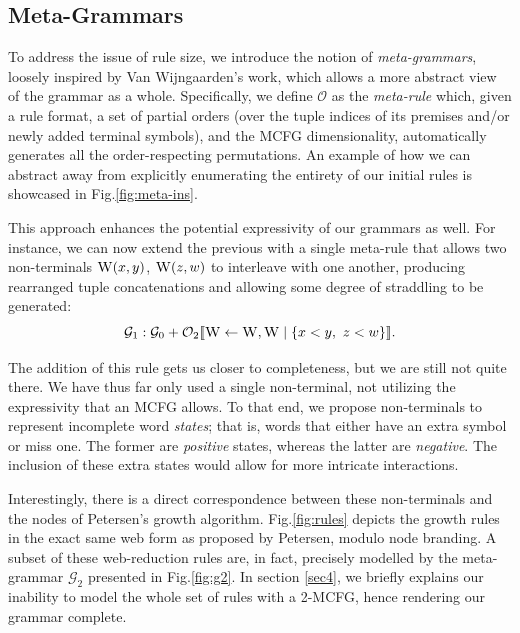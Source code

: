 \documentclass[nonatbib,numbers,10pt]{llncs}
\newcommand\s{\textsc}
\newcommand{\Orderr}[5]{
	\mathcal{#1}_{#5}\llbracket #2 \leftarrow #3 \mid \{ #4 \} \rrbracket.
}
\newcommand{\Or}[4]{\Orderr{O}{#1}{#2}{#3}{#4}}
\begin{document}
\subsection{Meta-Grammars}\label{subsec22}
To address the issue of rule size, we introduce the notion of \textit{meta-grammars}, loosely inspired by Van Wijngaarden's work\cite{vanwijn}, which allows a more abstract view of the grammar as a whole. Specifically, we define $\mathcal{O}$ as the \textit{meta-rule} which, given a rule format, a set of partial orders (over the tuple indices of its premises and/or newly added terminal symbols), and the MCFG dimensionality, automatically generates all the order-respecting permutations. An example of how we can abstract away from explicitly enumerating the entirety of our initial rules is showcased in Fig.\ref{fig:meta-ins}.

This approach enhances the potential expressivity of our grammars as well. For instance, we can now extend the previous with a single meta-rule that allows two non-terminals $\s{W}(x,y)$, $\s{W}(z,w)$ to interleave with one another, producing rearranged tuple concatenations and allowing some degree of straddling to be generated:
\[
\mathcal{G}_1: \mathcal{G}_0 + \Or{\s{W}}{\s{W}, \s{W}}{x < y,\ z < w}{2}
\]

The addition of this rule gets us closer to completeness, but we are still not quite there. We have thus far only used a single non-terminal, not utilizing the expressivity that an MCFG allows. To that end, we propose non-terminals to represent incomplete word \textit{states}; that is, words that either have an extra symbol or miss one. The former are \textit{positive} states, whereas the latter are \textit{negative}. The inclusion of these extra states would allow for more intricate interactions.

Interestingly, there is a direct correspondence between these non-terminals and the nodes of Petersen's growth algorithm\cite{petersen}. Fig.\ref{fig:rules} depicts the growth rules in the exact same web form as proposed by Petersen, modulo node branding. A subset of these web-reduction rules are, in fact, precisely modelled by the meta-grammar $\mathcal{G}_2$ presented in Fig.\ref{fig:g2}. In section \ref{sec4}, we briefly explains our inability to model the whole set of rules with a 2-MCFG, hence rendering our grammar complete.
\end{document}
